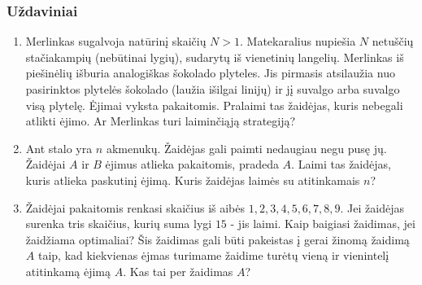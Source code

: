 \subsubsection{Uždaviniai}

\begin{enumerate}
  \item Merlinkas sugalvoja natūrinį skaičių $N>1$. Matekaralius nupiešia $N$
    netuščių stačiakampių (nebūtinai lygių), sudarytų iš vienetinių langelių.
    Merlinkas iš piešinėlių išburia analogiškas šokolado plyteles.
    Jis pirmasis atsilaužia nuo pasirinktos plytelės šokolado (laužia išilgai
    linijų) ir jį suvalgo arba suvalgo visą plytelę. Ėjimai vyksta
    pakaitomis. Pralaimi tas žaidėjas, kuris nebegali atlikti ėjimo.  Ar
    Merlinkas turi laiminčiąją strategiją?  

  \item Ant stalo yra $n$ akmenukų. Žaidėjas gali paimti nedaugiau negu pusę
    jų. Žaidėjai $A$ ir $B$ ėjimus atlieka pakaitomis, pradeda $A$.  Laimi
    tas žaidėjas, kuris atlieka paskutinį ėjimą. Kuris žaidėjas laimės su
    atitinkamais $n$?

  \item Žaidėjai pakaitomis renkasi skaičius iš aibės ${1, 2, 3, 4, 5, 6, 7,
    8, 9}$. Jei žaidėjas surenka tris skaičius, kurių suma lygi $15$ - jis
    laimi.  Kaip baigiasi žaidimas, jei žaidžiama optimaliai? Šis žaidimas
    gali būti pakeistas į gerai žinomą žaidimą $A$ taip, kad kiekvienas ėjmas
    turimame žaidime turėtų vieną ir vienintelį atitinkamą ėjimą $A$. Kas tai
    per žaidimas $A$? 


\end{enumerate}
